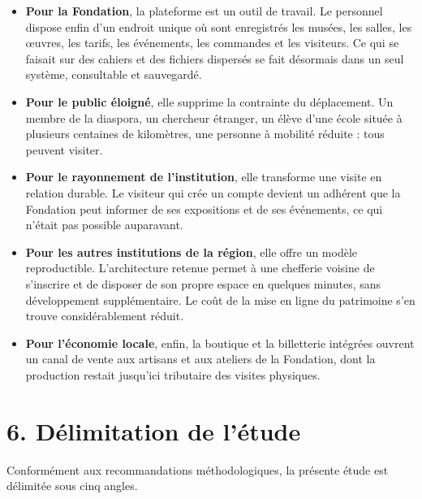 \begin{itemize}
  \item \textbf{Pour la Fondation}, la plateforme est un outil de travail. Le
        personnel dispose enfin d'un endroit unique où sont enregistrés les
        musées, les salles, les œuvres, les tarifs, les événements, les
        commandes et les visiteurs. Ce qui se faisait sur des cahiers et des
        fichiers dispersés se fait désormais dans un seul système, consultable
        et sauvegardé.

  \item \textbf{Pour le public éloigné}, elle supprime la contrainte du
        déplacement. Un membre de la diaspora, un chercheur étranger, un élève
        d'une école située à plusieurs centaines de kilomètres, une personne à
        mobilité réduite : tous peuvent visiter.

  \item \textbf{Pour le rayonnement de l'institution}, elle transforme une
        visite en relation durable. Le visiteur qui crée un compte devient un
        adhérent que la Fondation peut informer de ses expositions et de ses
        événements, ce qui n'était pas possible auparavant.

  \item \textbf{Pour les autres institutions de la région}, elle offre un modèle
        reproductible. L'architecture retenue permet à une chefferie voisine de
        s'inscrire et de disposer de son propre espace en quelques minutes,
        sans développement supplémentaire. Le coût de la mise en ligne du
        patrimoine s'en trouve considérablement réduit.

  \item \textbf{Pour l'économie locale}, enfin, la boutique et la billetterie
        intégrées ouvrent un canal de vente aux artisans et aux ateliers de la
        Fondation, dont la production restait jusqu'ici tributaire des visites
        physiques.
\end{itemize}

\section*{6. Délimitation de l'étude}

Conformément aux recommandations méthodologiques, la présente étude est délimitée
sous cinq angles.

